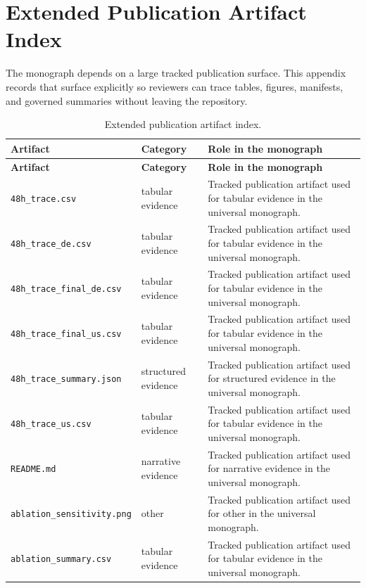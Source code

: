 \chapter{Extended Publication Artifact Index}
\label{app:publication-artifact-index}

The monograph depends on a large tracked publication surface. This appendix records that surface explicitly so reviewers can trace tables, figures, manifests, and governed summaries without leaving the repository.

\begin{longtable}{p{}p{}p{}}
\caption{Extended publication artifact index.}\label{tab:monograph-publication-artifact-index}\\
\toprule
\textbf{Artifact} & \textbf{Category} & \textbf{Role in the monograph}\\
\midrule
\endfirsthead
\toprule
\textbf{Artifact} & \textbf{Category} & \textbf{Role in the monograph}\\
\midrule
\endhead
\texttt{48h\_trace.csv} & tabular evidence & Tracked publication artifact used for tabular evidence in the universal monograph.\\
\texttt{48h\_trace\_de.csv} & tabular evidence & Tracked publication artifact used for tabular evidence in the universal monograph.\\
\texttt{48h\_trace\_final\_de.csv} & tabular evidence & Tracked publication artifact used for tabular evidence in the universal monograph.\\
\texttt{48h\_trace\_final\_us.csv} & tabular evidence & Tracked publication artifact used for tabular evidence in the universal monograph.\\
\texttt{48h\_trace\_summary.json} & structured evidence & Tracked publication artifact used for structured evidence in the universal monograph.\\
\texttt{48h\_trace\_us.csv} & tabular evidence & Tracked publication artifact used for tabular evidence in the universal monograph.\\
\texttt{README.md} & narrative evidence & Tracked publication artifact used for narrative evidence in the universal monograph.\\
\texttt{ablation\_sensitivity.png} & other & Tracked publication artifact used for other in the universal monograph.\\
\texttt{ablation\_summary.csv} & tabular evidence & Tracked publication artifact used for tabular evidence in the universal monograph.\\

\end{longtable}
